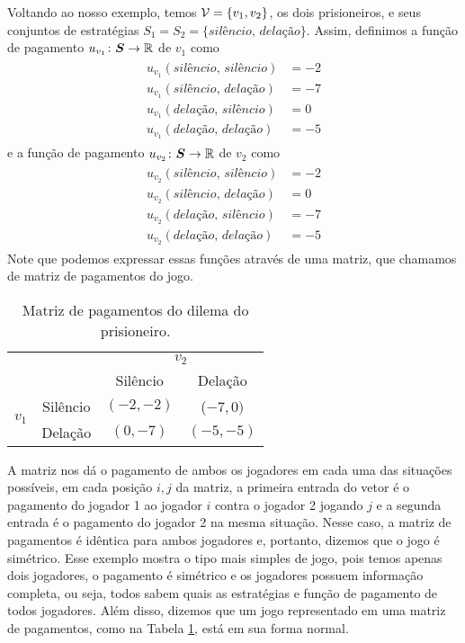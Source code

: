 Voltando ao nosso exemplo, temos $\mathcal{V}=\{v_1,v_2\}$, os dois prisioneiros, e seus conjuntos de estratégias $S_1=S_2=\{\textit{silêncio, delação}\}$. Assim, definimos a função de pagamento $u_{v_1}\colon\boldsymbol{S}\to\mathbb{R}$ de $v_1$ como
\begin{align}
\label{pagp1}
\begin{split}
    u_{v_1}(\textit{silêncio, silêncio})&=-2 \\
    u_{v_1}(\textit{silêncio, delação})&=-7 \\
    u_{v_1}(\textit{delação, silêncio})&=0 \\
    u_{v_1}(\textit{delação, delação})&=-5
\end{split}
\end{align}
e a função de pagamento $u_{v_2}\colon\boldsymbol{S}\to\mathbb{R}$ de $v_2$ como
\begin{align}
\label{pagp2}
\begin{split}
    u_{v_2}(\textit{silêncio, silêncio})&=-2 \\
    u_{v_2}(\textit{silêncio, delação})&=0 \\
    u_{v_2}(\textit{delação, silêncio})&=-7 \\
    u_{v_2}(\textit{delação, delação})&=-5
\end{split}
\end{align}
Note que podemos expressar essas funções através de uma matriz, que chamamos de matriz de pagamentos do jogo.

\begin{table}[h]
\begin{center}
    \begin{tabular}{cccc}
        & & \multicolumn{2}{c}{$v_2$} \\
        & & Silêncio & Delação      \\ \cline{3-4} 
        \multirow{2}{*}{$v_1$} & \multicolumn{1}{c|}{Silêncio} & \multicolumn{1}{c|}{$(-2,-2)$} & \multicolumn{1}{c|}{($-7,0)$}  \\ \cline{3-4} 
        & \multicolumn{1}{c|}{Delação} & \multicolumn{1}{c|}{$(0,-7)$}  & \multicolumn{1}{c|}{$(-5,-5)$} \\ \cline{3-4} 
    \end{tabular}
    \caption{Matriz de pagamentos do dilema do prisioneiro.}
    \label{mpdp}
\end{center}
\end{table}


A matriz nos dá o pagamento de ambos os jogadores em cada uma das situações possíveis, em cada posição $i,j$ da matriz, a primeira entrada do vetor é o pagamento do jogador 1 ao jogador $i$ contra o jogador 2 jogando $j$ e a segunda entrada é o pagamento do jogador 2 na mesma situação. Nesse caso, a matriz de pagamentos é idêntica para ambos jogadores e, portanto, dizemos que o jogo é simétrico. Esse exemplo mostra o tipo mais simples de jogo, pois temos apenas dois jogadores, o pagamento é simétrico e os jogadores possuem informação completa, ou seja, todos sabem quais as estratégias e função de pagamento de todos jogadores. Além disso, dizemos que um jogo representado em uma matriz de pagamentos, como na Tabela \ref{mpdp}, está em sua forma normal.

